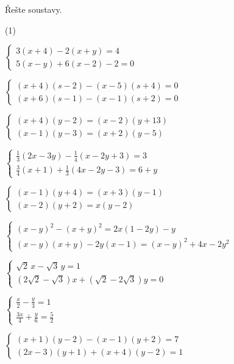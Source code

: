 \documentclass[12pt,a4paper]{article}
\begin{document}
\newpage
\begin{exercise}
Řešte soustavy.
\begin{tasks}(1)

\task $\begin{cases}
3(x+4) - 2(x+y) = 4\\
5(x-y) + 6(x-2) - 2 = 0
\end{cases}$

\task $\begin{cases}
(x+4)(s-2) - (x-5)(s+4) = 0\\
(x+6)(s-1) - (x-1)(s+2) = 0
\end{cases}$

\task $\begin{cases}
(x+4)(y-2) = (x-2)(y+13) \\
(x-1)(y-3) = (x+2)(y-5)
\end{cases}$

\task $\begin{cases}
\tfrac{1}{3}(2x-3y) - \tfrac{1}{4}(x-2y+3) = 3\\
\tfrac{3}{4}(x+1) + \tfrac{1}{3}(4x-2y-3) = 6 + y
\end{cases}$

\task $\begin{cases}
(x-1)(y+4) = (x+3)(y-1)\\
(x-2)(y+2) = x(y-2)
\end{cases}$

\task $\begin{cases}
(x-y)^2 - (x+y)^2 = 2x(1-2y) - y\\
(x-y)(x+y) - 2y(x-1) = (x-y)^2 + 4x - 2y^2
\end{cases}$

\task $\begin{cases}
\sqrt{2}\,x - \sqrt{3}\,y = 1\\
(2\sqrt{2}-\sqrt{3})x + (\sqrt{2}-2\sqrt{3})y = 0
\end{cases}$

\task $\begin{cases}
\tfrac{x}{2} - \tfrac{y}{3} = 1\\
\tfrac{3x}{4} + \tfrac{y}{6} = \tfrac{5}{2}
\end{cases}$

\task $\begin{cases}
(x+1)(y-2) - (x-1)(y+2) = 7\\
(2x-3)(y+1) + (x+4)(y-2) = 1
\end{cases}$

\end{tasks}
\end{exercise}
\end{document}
